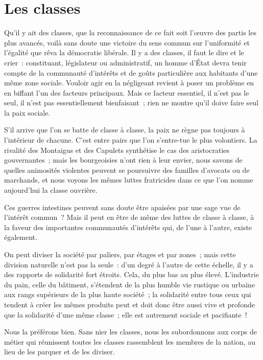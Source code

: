 \documentclass[french,twoside]{book} %
\begin{document}
\section[Les classes]{Les classes}
\noindent Qu’il y ait des classes, que la reconnaissance de ce fait soit l’œuvre des partis les plus avancés, voilà sans doute une victoire du sens commun sur l’uniformité et l’égalité que rêva la démocratie libérale. Il y a des classes, il faut le dire et le crier : constituant, législateur ou administratif, un homme d’État devra tenir compte de la communauté d’intérêts et de goûts particulière aux habitants d’une même zone sociale. Vouloir agir en la négligeant revient à poser un problème en en biffant l’un des facteurs principaux. Mais ce facteur essentiel, il n’est pas le seul, il n’est pas essentiellement bienfaisant ; rien ne montre qu’il doive faire seul la paix sociale.\par
S’il arrive que l’on se batte de classe à classe, la paix ne règne pas toujours à l’intérieur de chacune. C’est entre pairs que l’on s’entre-tue le plus volontiers. La rivalité des Montaigus et des Capulets synthétise le cas des aristocraties gouvernantes ; mais les bourgeoisies n’ont rien à leur envier, nous savons de quelles animosités violentes peuvent se poursuivre des familles d’avocats ou de marchands, et nous voyons les mêmes luttes fratricides dans ce que l’on nomme aujourd’hui la classe ouvrière.\par
Ces guerres intestines peuvent sans doute être apaisées par une sage vue de l’intérêt commun ? Mais il peut en être de même des luttes de classe à classe, à la faveur des importantes communautés d’intérêts qui, de l’une à l’autre, existe également.\par
On peut diviser la société par paliers, par étages et par zones ; mais cette division naturelle n’est pas la seule : d’un degré à l’autre de cette échelle, il y a des rapports de solidarité fort étroits. Cela, du plus bas au plus élevé. L’industrie du pain, celle du bâtiment, s’étendent de la plus humble vie rustique ou urbaine aux rangs supérieurs de la plus haute société ; la solidarité entre tous ceux qui tendent à créer les mêmes produits peut et doit donc être aussi vive et profonde que la solidarité d’une même classe ; elle est autrement sociale et pacifiante !\par
Nous la préférons bien. Sans nier les classes, nous les subordonnons aux corps de métier qui réunissent toutes les classes rassemblent les membres de la nation, au lieu de les parquer et de les diviser.\par
\end{document}

